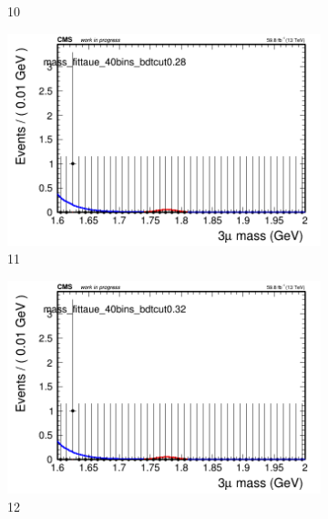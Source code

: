 \begin{figure}[h!]
\begin{subfigure}{0.2\textwidth}
        \caption{10}
    \end{subfigure}
    \begin{subfigure}{0.2\textwidth}
        \includegraphics[width=\textwidth]{power_law/plots/taue/massfit_taue_40bins_bdtcut0.28.png}
        \caption{11}
    \end{subfigure}
    \begin{subfigure}{0.2\textwidth}
        \includegraphics[width=\textwidth]{power_law/plots/taue/massfit_taue_40bins_bdtcut0.32.png}
        \caption{12}
    \end{subfigure}
    \begin{subfigure}{0.2\textwidth}

\end{subfigure}
\end{figure}
